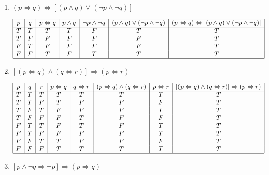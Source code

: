 \documentclass[11pt]{scrartcl}
\begin{document}
\begin{enumerate}[label=\alph*.]
{		}
	\item{
			$(p\Leftrightarrow q) \Leftrightarrow [(p \land q) \lor (\lnot p \land \lnot q)]$
		\begin{center}
		\begin{displaymath}
		\begin{array}{|c|c|c|c|c|c|c|}
			\hline
			p & q & p\Leftrightarrow q & p \land q & \lnot p \land \lnot q & (p \land q) \lor (\lnot p \land \lnot q) & (p\Leftrightarrow q) \Leftrightarrow [(p \land q) \lor (\lnot p \land \lnot q)]\\
			\hline
			T & T & T & T & F & T & T\\
			T & F & F & F & F & F & T\\
			F & T & F & F & F & F & T\\
			F & F & T & F & T & T & T\\
			\hline
		\end{array}
		\end{displaymath}
		\end{center}
		}
	\item{
			$[(p \Leftrightarrow q) \land (q \Leftrightarrow r)] \Rightarrow (p \Leftrightarrow r)$ 
		\begin{center}
		\begin{displaymath}
		\begin{array}{|c|c|c|c|c|c|c|c|}
			\hline
			p & q & r & p \Leftrightarrow q & q \Leftrightarrow r & (p \Leftrightarrow q) \land (q \Leftrightarrow r) & p \Leftrightarrow r & [(p \Leftrightarrow q) \land (q \Leftrightarrow r)] \Rightarrow (p \Leftrightarrow r) \\ 
			\hline
			T & T & T & T & T & T & T & T\\
			T & T & F & T & F & F & F & T\\
			T & F & T & F & F & F & T & T\\
			T & F & F & F & T & F & F & T\\
			F & T & T & F & T & F & T & T\\
			F & T & F & F & F & F & T & T\\
			F & F & T & T & F & F & F & T\\
			F & F & F & T & T & T & T & T\\
			\hline
		\end{array}
		\end{displaymath}
		\end{center}
		}
	\item{
			$[p\land \lnot q \Rightarrow \lnot p] \Rightarrow (p \Rightarrow q)$
		\begin{center}

\end{center}}
\end{enumerate}
\end{document}
